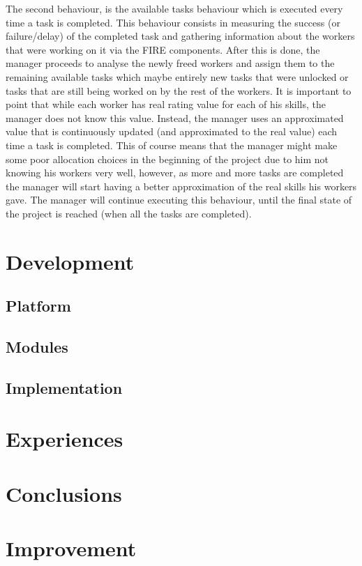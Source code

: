 \documentclass[paper=a4, fontsize=11pt]{scrartcl} %
\numberwithin{equation}{section} %
\numberwithin{figure}{section} %
\numberwithin{table}{section} %
\begin{document}

The second behaviour, is the available tasks behaviour which is executed every time a task is completed. This behaviour consists in measuring the success (or failure/delay) of the completed task and gathering information about the workers that were working on it via the FIRE components. After this is done, the manager proceeds to analyse the newly freed workers and assign them to the remaining available tasks which maybe entirely new tasks that were unlocked or tasks that are still being worked on by the rest of the workers. It is important to point that while each worker has real rating value for each of his skills, the manager does not know this value. Instead, the manager uses an approximated value that is continuously updated (and approximated to the real value) each time a task is completed. This of course means that the manager might make some poor allocation choices in the beginning of the project due to him not knowing his workers very well, however, as more and more tasks are completed the manager will start having a better approximation of the real skills his workers gave. The manager will continue executing this behaviour, until the final state of the project is reached (when all the tasks are completed).
\section{Development}

\subsection{Platform}

\subsection{Modules}

\subsection{Implementation}

\section{Experiences}

\section{Conclusions}

\section{Improvement}
\end{document}
